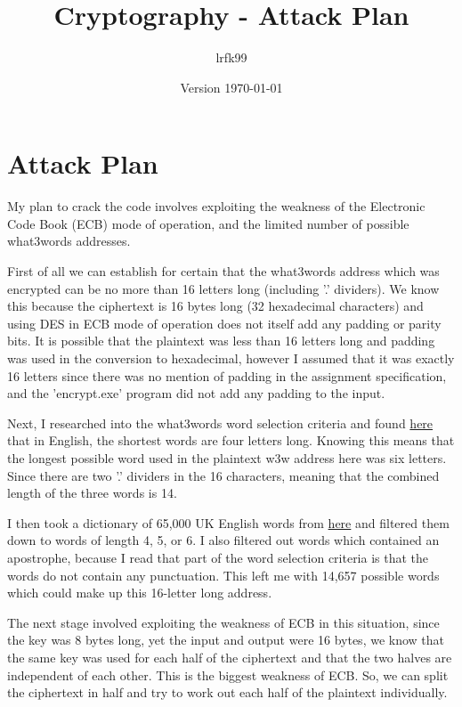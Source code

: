 \documentclass[a4paper, 11pt]{article}
\title{Cryptography - Attack Plan}
\date{Version \today}
\author{lrfk99}
\begin{document}
\maketitle

\section{Attack Plan}
 
My plan to crack the code involves exploiting the weakness of the Electronic Code Book (ECB) mode of operation, and the limited number of possible what3words addresses.

First of all we can establish for certain that the what3words address which was encrypted can be no more than 16 letters long (including '.' dividers). 
We know this because the ciphertext is 16 bytes long (32 hexadecimal characters) and using DES in ECB mode of operation does not itself add any padding or parity bits. 
It is possible that the plaintext was less than 16 letters long and padding was used in the conversion to hexadecimal, 
however I assumed that it was exactly 16 letters since there was no mention of padding in the assignment specification, 
and the 'encrypt.exe' program did not add any padding to the input.

Next, I researched into the what3words word selection criteria and found \href{https://support.what3words.com/en/articles/2212810-what-are-the-shortest-and-longest-words-used}{here}
that in English, the shortest words are four letters long. 
Knowing this means that the longest possible word used in the plaintext w3w address here was six letters. 
Since there are two '.' dividers in the 16 characters, meaning that the combined length of the three words is 14.

I then took a dictionary of 65,000 UK English words from \href{http://gwicks.net/dictionaries.htm}{here} and filtered them down to words of length 4, 5, or 6. 
I also filtered out words which contained an apostrophe, because I read that part of the word selection criteria is that the words do not contain any punctuation. 
This left me with 14,657 possible words which could make up this 16-letter long address. 

The next stage involved exploiting the weakness of ECB in this situation, since the key was 8 bytes long, yet the input and output were 16 bytes, 
we know that the same key was used for each half of the ciphertext and that the two halves are independent of each other. 
This is the biggest weakness of ECB. 
So, we can split the ciphertext in half and try to work out each half of the plaintext individually. 
\end{document}
